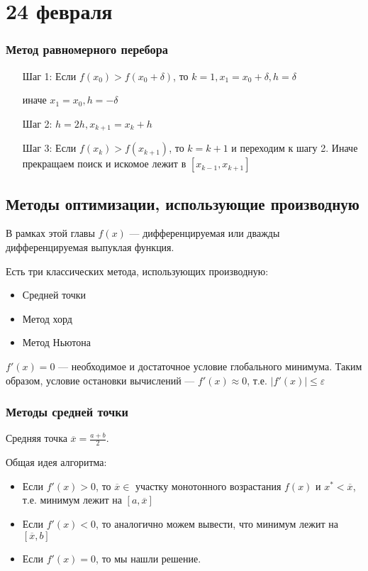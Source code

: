 \chapter{24 февраля}

\subsection{Метод равномерного перебора}

\begin{itemize}
    \item [Шаг 1:] Если \(f(x_0) > f(x_0 + \delta)\), то \(k = 1, x_1 = x_0 + \delta, h = \delta\)

          иначе \(x_1 = x_0, h = - \delta\)

    \item [Шаг 2:] \(h = 2h, x_{k+1} = x_k + h\)
    \item [Шаг 3:] Если \(f(x_k) > f(x_{k+1})\), то \(k = k + 1\) и переходим к шагу 2. Иначе прекращаем поиск и искомое лежит в \([x_{k - 1}, x_{k + 1}]\)
\end{itemize}

\section{Методы оптимизации, использующие производную}

В рамках этой главы \(f(x)\) --- дифференцируемая или дважды дифференцируемая выпуклая функция.

Есть три классических метода, использующих производную:
\begin{itemize}
    \item Средней точки
    \item Метод хорд
    \item Метод Ньютона
\end{itemize}

\(f'(x) = 0\) --- необходимое и достаточное условие глобального минимума. Таким образом, условие остановки вычислений --- \(f'(x) \approx 0\), т.е. \(|f'(x)| \leq \varepsilon\)

\subsection{Методы средней точки}

Средняя точка \(\overline x = \frac{a + b}{2}\).

Общая идея алгоритма:
\begin{itemize}
    \item Если \(f'(x) > 0\), то \(\overline x\in\) участку монотонного возрастания \(f(x)\) и \(x^* < \overline x\), т.е. минимум лежит на \([a, \overline x]\)
    \item Если \(f'(x) < 0\), то аналогично можем вывести, что минимум лежит на \([\overline x, b]\)
    \item Если \(f'(x) = 0\), то мы нашли решение.
\end{itemize}

